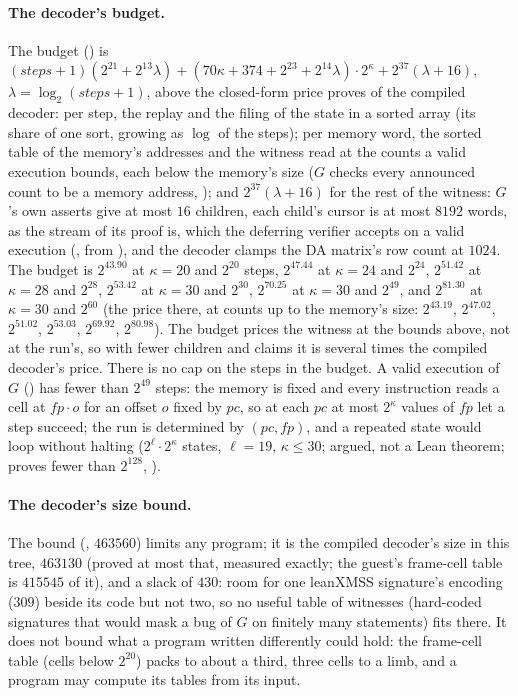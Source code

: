 \documentclass[11pt]{article}
\begin{document}
\paragraph{The decoder's budget.} The budget () is
$(\mathit{steps} + 1)(2^{21} + 2^{13}\lambda) + (70\kappa + 374 + 2^{23} + 2^{14}\lambda)\cdot 2^\kappa + 2^{37}(\lambda + 16)$,
$\lambda = \log_2(\mathit{steps} + 1)$, above the closed-form price  proves of the
compiled decoder: per step, the replay and the filing of the state in a sorted array (its share of
one sort, growing as $\log$ of the steps); per memory word, the sorted table of the memory's
addresses and the witness read at the counts a valid execution bounds, each below the memory's
size ($G$ checks every announced count to be a memory address, ); and
$2^{37}(\lambda + 16)$ for the rest of the witness: $G$'s own asserts give at most $16$ children,
each child's cursor is at most $8192$ words, as the stream of its proof is, which the deferring
verifier accepts on a valid execution (, from
), and the decoder clamps the DA matrix's row count at $1024$. The
budget is $2^{43.90}$ at $\kappa = 20$ and $2^{20}$ steps, $2^{47.44}$ at $\kappa = 24$ and
$2^{24}$, $2^{51.42}$ at $\kappa = 28$ and $2^{28}$, $2^{53.42}$ at $\kappa = 30$ and $2^{30}$,
$2^{70.25}$ at $\kappa = 30$ and $2^{49}$, and $2^{81.30}$ at $\kappa = 30$ and $2^{60}$ (the price
there, at counts up to the memory's size: $2^{43.19}$, $2^{47.02}$, $2^{51.02}$, $2^{53.03}$,
$2^{69.92}$, $2^{80.98}$). The budget prices the witness at the bounds above, not at the run's, so
with fewer children and claims it is several times the compiled decoder's price. There is no cap on the steps in the budget. A valid execution of $G$ ()
has fewer than $2^{49}$ steps: the memory is fixed and every instruction reads a cell at
$\mathit{fp}\cdot o$ for an offset $o$ fixed by $\mathit{pc}$, so at each $\mathit{pc}$ at most
$2^\kappa$ values of $\mathit{fp}$ let a step succeed; the run is determined by
$(\mathit{pc}, \mathit{fp})$, and a repeated state would loop without halting
($2^\ell\cdot 2^\kappa$ states, $\ell = 19$, $\kappa \le 30$; argued, not a Lean theorem;
 proves fewer than $2^{128}$, ).

\paragraph{The decoder's size bound.} The bound (, $463560$)
limits any program; it is the compiled decoder's size in this tree, $463130$ (proved
at most that, measured exactly; the guest's frame-cell table is $415545$ of it), and a slack of
$430$: room for one leanXMSS signature's encoding ($309$) beside its code but not two, so no useful
table of witnesses (hard-coded signatures that would mask a bug of $G$ on finitely many statements)
fits there. It does not bound what a program written differently could hold: the frame-cell table
(cells below $2^{20}$) packs to about a third, three cells to a limb, and a program may compute its
tables from its input.
\end{document}
